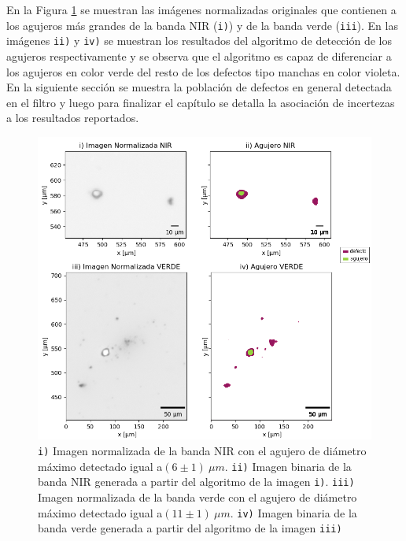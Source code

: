 En la Figura \ref{fig:aggjj} se muestran las imágenes normalizadas originales que contienen a los agujeros más grandes de la banda NIR (\texttt{i)}) y de la banda verde (\texttt{iii}). En las imágenes \texttt{ii)} y \texttt{iv)} se muestran los resultados del algoritmo de detección de los agujeros respectivamente y se observa que el algoritmo es capaz de diferenciar a los agujeros en color verde del resto de los defectos tipo manchas en color violeta.
En la siguiente sección se muestra la población de defectos en general detectada en el filtro y luego para finalizar el capítulo se detalla la asociación de incertezas a los resultados reportados.
 \begin{figure}
\centering
\includegraphics[scale=1.0]{Figs/cuantificaciondefectos/agujerross.png}
\caption{\texttt{i)} Imagen normalizada de la banda NIR con el agujero de diámetro máximo detectado igual a$(6 \pm 1)~ \mu m$. \texttt{ii)} Imagen binaria de la banda NIR generada a partir del algoritmo de la imagen \texttt{i)}. \texttt{iii)} Imagen normalizada de la banda verde con el agujero de diámetro máximo detectado igual a$(11 \pm 1)~ \mu m$. \texttt{iv)} Imagen binaria de la banda verde generada a partir del algoritmo de la imagen \texttt{iii)}}
\label{fig:aggjj}
\end{figure}



\singlespacing
